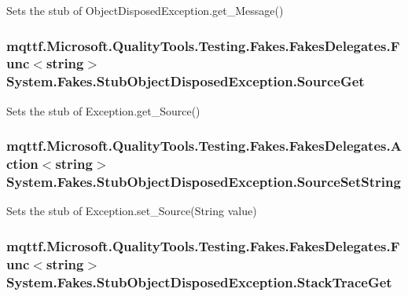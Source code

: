 Sets the stub of Object\-Disposed\-Exception.\-get\-\_\-\-Message()

\hypertarget{class_system_1_1_fakes_1_1_stub_object_disposed_exception_afc465e7606a0fd33c0c6851cfda60d5e}{
\subsubsection[{Source\-Get}]{\setlength{\rightskip}{0pt plus 5cm}mqttf.\-Microsoft.\-Quality\-Tools.\-Testing.\-Fakes.\-Fakes\-Delegates.\-Func$<$string$>$ System.\-Fakes.\-Stub\-Object\-Disposed\-Exception.\-Source\-Get}}\label{class_system_1_1_fakes_1_1_stub_object_disposed_exception_afc465e7606a0fd33c0c6851cfda60d5e}


Sets the stub of Exception.\-get\-\_\-\-Source()

\hypertarget{class_system_1_1_fakes_1_1_stub_object_disposed_exception_a67b8e6a9a9becf24f4943846748e1b53}{
\subsubsection[{Source\-Set\-String}]{\setlength{\rightskip}{0pt plus 5cm}mqttf.\-Microsoft.\-Quality\-Tools.\-Testing.\-Fakes.\-Fakes\-Delegates.\-Action$<$string$>$ System.\-Fakes.\-Stub\-Object\-Disposed\-Exception.\-Source\-Set\-String}}\label{class_system_1_1_fakes_1_1_stub_object_disposed_exception_a67b8e6a9a9becf24f4943846748e1b53}


Sets the stub of Exception.\-set\-\_\-\-Source(\-String value)

\hypertarget{class_system_1_1_fakes_1_1_stub_object_disposed_exception_a6f24418a64543113a611fdbaa9bf5b94}{
\subsubsection[{Stack\-Trace\-Get}]{\setlength{\rightskip}{0pt plus 5cm}mqttf.\-Microsoft.\-Quality\-Tools.\-Testing.\-Fakes.\-Fakes\-Delegates.\-Func$<$string$>$ System.\-Fakes.\-Stub\-Object\-Disposed\-Exception.\-Stack\-Trace\-Get}}\label{class_system_1_1_fakes_1_1_stub_object_disposed_exception_a6f24418a64543113a611fdbaa9bf5b94}


